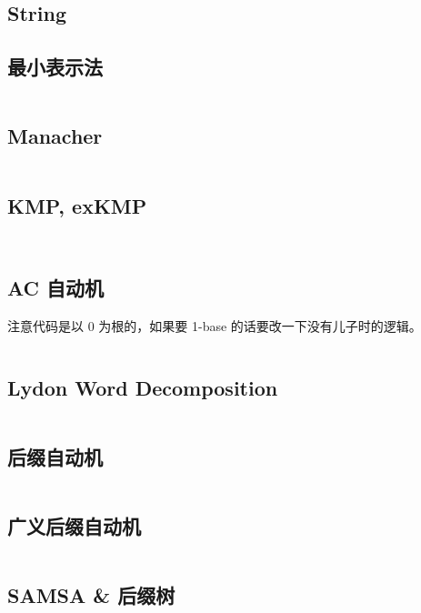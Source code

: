 \documentclass[titlepage, a4paper]{article}
\begin{document}
\begin{multicols}{2}
\begin{spacing}{0.6}
			\section{String}
				\subsection{最小表示法}
					\inputminted{cpp}{src/String/最小表示法.cpp}
				\subsection{Manacher}
					\inputminted{cpp}{src/String/Manacher.cpp}
				\subsection{KMP, exKMP}
					\inputminted{cpp}{src/String/KMP.cpp}
					\inputminted{cpp}{src/String/EXKMP.cpp}
				\subsection{AC 自动机}
					注意代码是以 0 为根的，如果要 1-base 的话要改一下没有儿子时的逻辑。
					\inputminted{cpp}{src/String/AC 自动机.cpp}
				\subsection{Lydon Word Decomposition}
					\inputminted{cpp}{src/String/Lyndon Word.cpp}
				\subsection{后缀自动机}
					\inputminted{cpp}{src/String/SAM.cpp}
				\subsection{广义后缀自动机}
					\inputminted{cpp}{src/String/广义SAM.cpp}
				\subsection{SAMSA \& 后缀树}
					\inputminted{cpp}{src/String/SAMSA.cpp}

\end{spacing}
\end{multicols}
\end{document}
